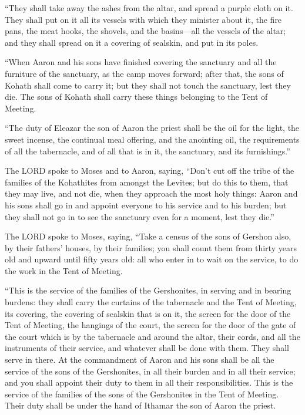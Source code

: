  ``They shall take away the ashes from the altar, and
spread a purple cloth on it.  They shall put on it all
its vessels with which they minister about it, the fire pans, the meat
hooks, the shovels, and the basins---all the vessels of the altar; and
they shall spread on it a covering of sealskin, and put in its poles.

 ``When Aaron and his sons have finished covering the
sanctuary and all the furniture of the sanctuary, as the camp moves
forward; after that, the sons of Kohath shall come to carry it; but they
shall not touch the sanctuary, lest they die. The sons of Kohath shall
carry these things belonging to the Tent of Meeting.

 ``The duty of Eleazar the son of Aaron the priest shall
be the oil for the light, the sweet incense, the continual meal
offering, and the anointing oil, the requirements of all the tabernacle,
and of all that is in it, the sanctuary, and its furnishings.''

 The LORD spoke to Moses and to Aaron, saying,
 ``Don't cut off the tribe of the families of the
Kohathites from amongst the Levites;  but do this to
them, that they may live, and not die, when they approach the most holy
things: Aaron and his sons shall go in and appoint everyone to his
service and to his burden;  but they shall not go in to
see the sanctuary even for a moment, lest they die.''

 The LORD spoke to Moses, saying,  ``Take
a census of the sons of Gershon also, by their fathers' houses, by their
families;  you shall count them from thirty years old and
upward until fifty years old: all who enter in to wait on the service,
to do the work in the Tent of Meeting.

 ``This is the service of the families of the
Gershonites, in serving and in bearing burdens:  they
shall carry the curtains of the tabernacle and the Tent of Meeting, its
covering, the covering of sealskin that is on it, the screen for the
door of the Tent of Meeting,  the hangings of the court,
the screen for the door of the gate of the court which is by the
tabernacle and around the altar, their cords, and all the instruments of
their service, and whatever shall be done with them. They shall serve in
there.  At the commandment of Aaron and his sons shall be
all the service of the sons of the Gershonites, in all their burden and
in all their service; and you shall appoint their duty to them in all
their responsibilities.  This is the service of the
families of the sons of the Gershonites in the Tent of Meeting. Their
duty shall be under the hand of Ithamar the son of Aaron the priest.

